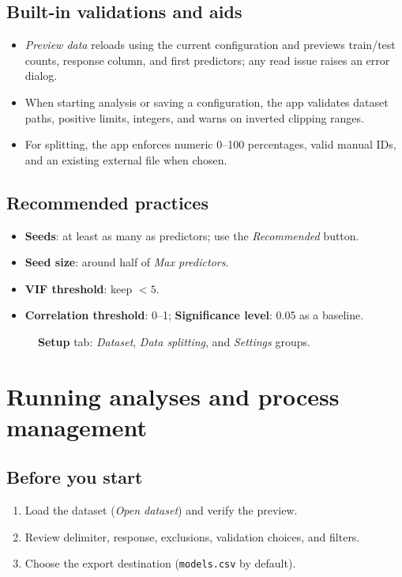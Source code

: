 \documentclass[12pt,a4paper]{article}
\begin{document}
\subsection{Built-in validations and aids}
\begin{itemize}
  \item \emph{Preview data} reloads using the current configuration and previews train/test counts, response column, and first predictors; any read issue raises an error dialog.
  \item When starting analysis or saving a configuration, the app validates dataset paths, positive limits, integers, and warns on inverted clipping ranges.
  \item For splitting, the app enforces numeric 0–100 percentages, valid manual IDs, and an existing external file when chosen.
\end{itemize}

\subsection{Recommended practices}
\begin{itemize}
  \item \textbf{Seeds}: at least as many as predictors; use the \emph{Recommended} button.
  \item \textbf{Seed size}: around half of \emph{Max predictors}.
  \item \textbf{VIF threshold}: keep $<5$.
  \item \textbf{Correlation threshold}: 0–1; \textbf{Significance level}: 0.05 as a baseline.
\end{itemize}

\begin{figure}[H]
  \centering
  \fbox{\rule[0pt]{0pt}{120pt}\hspace{0.9\linewidth}}
  \caption{\textbf{Setup} tab: \emph{Dataset}, \emph{Data splitting}, and \emph{Settings} groups.}
  \label{fig:setup}
\end{figure}

\section{Running analyses and process management}
\subsection{Before you start}
\begin{enumerate}
  \item Load the dataset (\emph{Open dataset}) and verify the preview.
  \item Review delimiter, response, exclusions, validation choices, and filters.
  \item Choose the export destination (\texttt{models.csv} by default).
\end{enumerate}
\end{document}
